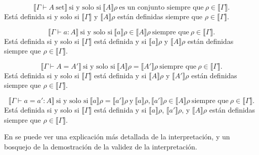 \documentclass[11pt,oneside]{report}
\theoremstyle{plain}
\theoremstyle{definition}
\begin{document}
    \begin{equation*}
    \llbracket\Gamma \vdash A \ \text{set}\rrbracket \ \text{si y solo si} \ \llbracket A \rrbracket\rho \ \text{es un conjunto siempre que} \ \rho \in \llbracket\Gamma\rrbracket.
    \end{equation*}
    Está definida si y solo si $\llbracket \Gamma \rrbracket$ y $\llbracket A \rrbracket\rho$ están definidas siempre que $\rho \in \llbracket\Gamma\rrbracket$.

    \begin{equation*}
    \llbracket\Gamma \vdash a : A\rrbracket \ \text{si y solo si} \ \llbracket a \rrbracket\rho \in \llbracket A \rrbracket\rho \ \text{siempre que} \ \rho \in \llbracket\Gamma\rrbracket.
    \end{equation*}
    Está definida si y solo si $\llbracket \Gamma \rrbracket$ está definida y si $\llbracket a \rrbracket\rho$ y $\llbracket A \rrbracket\rho$ están definidas siempre que $\rho \in \llbracket \Gamma \rrbracket$.

    \begin{equation*}
    \llbracket\Gamma \vdash A = A'\rrbracket \ \text{si y solo si} \ \llbracket A \rrbracket\rho = \llbracket A' \rrbracket\rho \ \text{siempre que} \ \rho \in \llbracket\Gamma\rrbracket.
    \end{equation*}
    Está definida si y solo si $\llbracket \Gamma \rrbracket$ está definida y si $\llbracket A \rrbracket\rho$ y $\llbracket A' \rrbracket\rho$ están definidas siempre que $\rho \in \llbracket\Gamma\rrbracket$.

    \begin{equation*}
    \llbracket\Gamma \vdash a = a' : A\rrbracket \ \text{si y solo si} \ \llbracket a \rrbracket\rho = \llbracket a' \rrbracket\rho \ \text{y} \ \llbracket a \rrbracket\rho, \llbracket a' \rrbracket\rho \in \llbracket A \rrbracket\rho \ \text{siempre que} \ \rho \in \llbracket\Gamma\rrbracket.
    \end{equation*}
    Está definida si y solo si $\llbracket \Gamma \rrbracket$ está definida y si $\llbracket a \rrbracket\rho$, $\llbracket a' \rrbracket\rho$, y $\llbracket A \rrbracket\rho$ están definidas siempre que $\rho \in \llbracket\Gamma\rrbracket$.

En \cite{Peter Dybjer} se puede ver una explicación más detallada de la interpretación, y un bosquejo de la demostración de la validez de la interpretación.
\end{document}
